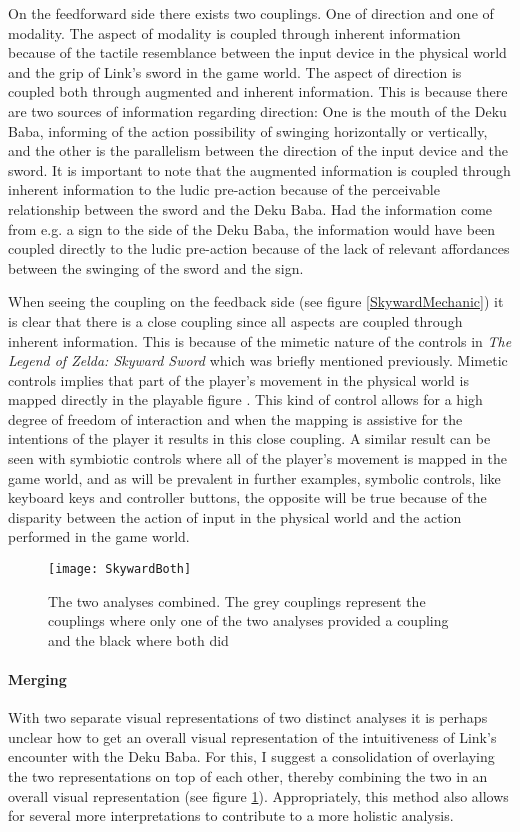 On the feedforward side there exists two couplings. One of direction and one of modality. The aspect of modality is coupled through inherent information because of the tactile resemblance between the input device in the physical world and the grip of Link's sword in the game world. The aspect of direction is coupled both through augmented and inherent information. This is because there are two sources of information regarding direction: One is the mouth of the Deku Baba, informing of the action possibility of swinging horizontally or vertically, and the other is the parallelism between the direction of the input device and the sword. It is important to note that the augmented information is coupled through inherent information to the ludic pre-action because of the perceivable relationship between the sword and the Deku Baba. Had the information come from e.g. a sign to the side of the Deku Baba, the information would have been coupled directly to the ludic pre-action because of the lack of relevant affordances between the swinging of the sword and the sign.

When seeing the coupling on the feedback side (see figure \ref{SkywardMechanic}) it is clear that there is a close coupling since all aspects are coupled through inherent information. This is because of the mimetic nature of the controls in \textit{The Legend of Zelda: Skyward Sword} which was briefly mentioned previously. Mimetic controls implies that part of the player's movement in the physical world is mapped directly in the playable figure \cite{calleja}. This kind of control allows for a high degree of freedom of interaction and when the mapping is assistive for the intentions of the player it results in this close coupling. A similar result can be seen with symbiotic controls where all of the player's movement is mapped in the game world, and as will be prevalent in further examples, symbolic controls, like keyboard keys and controller buttons, the opposite will be true because of the disparity between the action of input in the physical world and the action performed in the game world.

\begin{figure}[h]
  \texttt{[image: SkywardBoth]}
  \caption{The two analyses combined. The grey couplings represent the couplings where only one of the two analyses provided a coupling and the black where both did}
  \label{SkywardBoth}
\end{figure}

\paragraph{Merging}
With two separate visual representations of two distinct analyses it is perhaps unclear how to get an overall visual representation of the intuitiveness of Link's encounter with the Deku Baba. For this, I suggest a consolidation of overlaying the two representations on top of each other, thereby combining the two in an overall visual representation (see figure \ref{SkywardBoth}). Appropriately, this method also allows for several more interpretations to contribute to a more holistic analysis.


